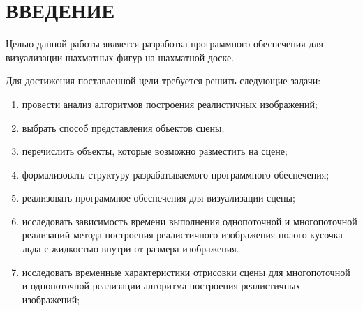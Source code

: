 \chapter*{ВВЕДЕНИЕ}

Целью данной работы является разработка программного обеспечения для визуализации шахматных фигур на шахматной доске.

Для достижения поставленной цели требуется решить следующие задачи:
\begin{enumerate}[label={\arabic*)}]
	\item провести анализ алгоритмов построения реалистичных изображений;
	\item выбрать способ представления обьектов сцены;
	\item перечислить объекты, которые возможно разместить на сцене;
	\item формализовать структуру разрабатываемого программного обеспечения;
	\item реализовать программное обеспечения для визуализации сцены;
	\item исследовать зависимость времени выполнения однопоточной и многопоточной реализаций метода построения реалистичного изображения полого кусочка льда с жидкостью внутри от размера изображения.
	\item исследовать временные характеристики отрисовки сцены для многопоточной и однопоточной реализации алгоритма построения реалистичных изображений;
\end{enumerate}

\clearpage
